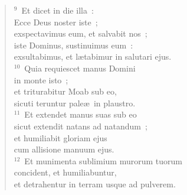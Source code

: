 \begin{verse}${}^{9}$~Et dicet in die illa~:\\ Ecce Deus noster iste~;\\ exspectavimus eum, et salvabit nos~;\\ iste Dominus, sustinuimus eum~:\\ exsultabimus, et l\ae tabimur in salutari ejus.\\
${}^{10}$~Quia requiescet manus Domini\\ in monte isto~;\\ et triturabitur Moab sub eo,\\ sicuti teruntur pale\ae\ in plaustro.\\
${}^{11}$~Et extendet manus suas sub eo\\ sicut extendit natans ad natandum~;\\ et humiliabit gloriam ejus\\ cum allisione manuum ejus.\\
${}^{12}$~Et munimenta sublimium murorum tuorum\\ concident, et humiliabuntur,\\ et detrahentur in terram usque ad pulverem.\end{verse}


